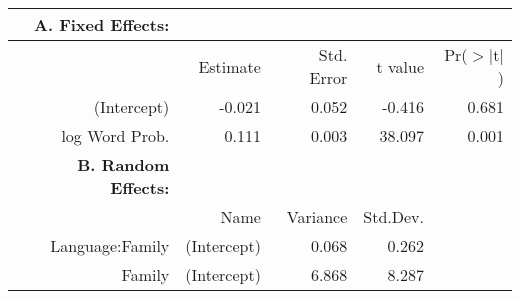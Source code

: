 \begin{tabular}{rrrrr}
 {\bf A. Fixed Effects:} \\
\hline
 & Estimate & Std. Error & t value & Pr($>$$|$t$|$) \\ 
  \hline
(Intercept) & -0.021 & 0.052 & -0.416 & 0.681 \\ 
  log Word Prob. & 0.111 & 0.003 & 38.097 & 0.001 \\ 

\hline \hline
{\bf B. Random Effects:} \\
\hline
& Name & Variance & Std.Dev. \\
\hline
Language:Family & (Intercept) & 0.068 & 0.262 \\
Family & (Intercept) & 6.868 & 8.287 \\
\end{tabular}
